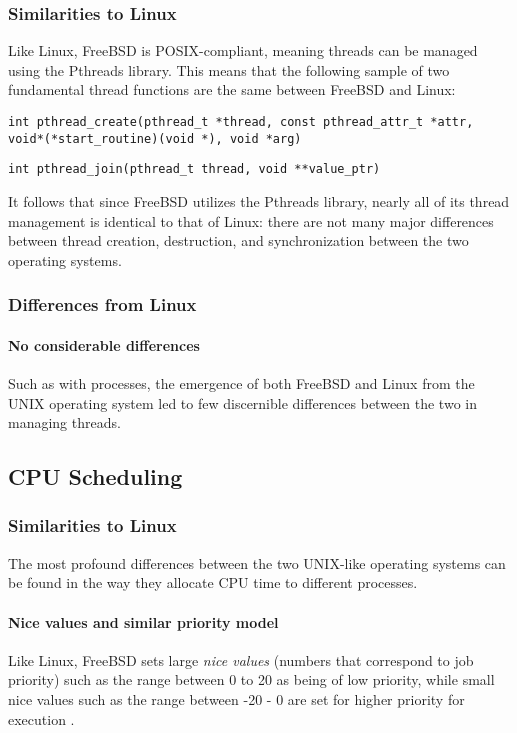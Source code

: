 \documentclass[letterpaper,10pt,titlepage]{article}
\begin{document}
\subsubsection{Similarities to Linux}
Like Linux, FreeBSD is POSIX-compliant, meaning threads can be managed using the Pthreads library. This means that the following sample of two fundamental thread functions are the same between FreeBSD and Linux:
\begin{lstlisting}
int pthread_create(pthread_t *thread, const pthread_attr_t *attr, void*(*start_routine)(void *), void *arg)
\end{lstlisting}
\begin{lstlisting}
int pthread_join(pthread_t thread, void **value_ptr)
\end{lstlisting}
It follows that since FreeBSD utilizes the Pthreads library, nearly all of its thread management is identical to that of Linux: there are not many major differences between thread creation, destruction, and synchronization between the two operating systems.
\subsubsection{Differences from Linux}
\paragraph{No considerable differences} Such as with processes, the emergence of both FreeBSD and Linux from the UNIX operating system led to few discernible differences between the two in managing threads. 
\subsection{CPU Scheduling}
\subsubsection{Similarities to Linux}
The most profound differences between the two UNIX-like operating systems can be found in the way they allocate CPU time to different processes. 
\paragraph{Nice values and similar priority model} Like Linux, FreeBSD sets large \emph{nice values} (numbers that correspond to job priority) such as the range between 0 to 20 as being of low priority, while small nice values such as the range between -20 - 0 are set for higher priority for execution \cite{boe01}. 
\end{document}

